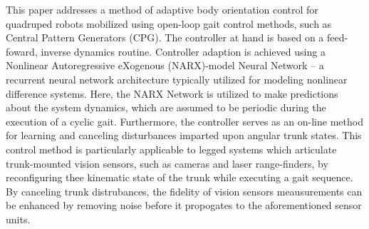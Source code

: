 
This paper addresses a method of adaptive body orientation control for quadruped robots mobilized
using open-loop gait control methods, such as Central Pattern Generators (CPG). The controller at
hand is based on a feed-foward, inverse dynamics routine. Controller adaption is achieved using a 
Nonlinear Autoregressive eXogenous (NARX)-model Neural Network -- a recurrent neural network
architecture typically utilized for modeling nonlinear difference systems. Here, the NARX Network is
utilized to make predictions about the system dynamics, which are assumed to be periodic during
the execution of a cyclic gait. Furthermore, the controller serves as an on-line method for
learning and canceling disturbances imparted upon angular trunk states. This control method
is particularly applicable to legged systems which articulate trunk-mounted vision sensors, such
as cameras and laser range-finders, by reconfiguring thee kinematic state of the trunk
while executing a gait sequence. By canceling trunk distrubances, the fidelity of vision
sensors meausurements can be enhanced by removing noise before it propogates to the aforementioned
sensor units.

